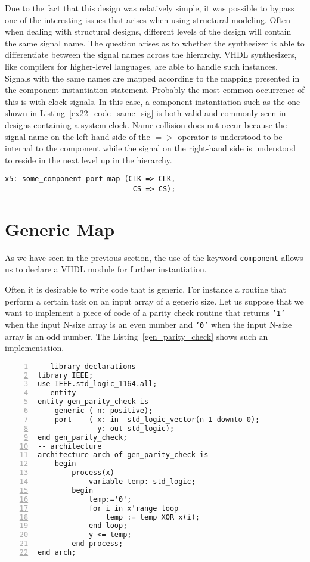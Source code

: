 Due to the fact that this design was relatively simple, it was possible to bypass one of the interesting issues that arises when using structural modeling. Often when dealing with structural designs, different levels of the design will contain the same signal name. The question arises as to whether the synthesizer is able to differentiate between the signal names across the hierarchy. VHDL synthesizers, like compilers for higher-level languages, are able to handle such instances. Signals with the same names are mapped according to the mapping presented in the component instantiation statement. Probably the most common occurrence of this is with clock signals. In this case, a component instantiation such as the one shown in Listing~\ref{ex22_code_same_sig} is both valid and commonly seen in designs containing a system clock. Name collision does not occur because the signal name on the left-hand side of the $=>$ operator is understood to be internal to the component while the signal on the right-hand side is understood to reside in the next level up in the hierarchy.

\noindent
\begin{minipage}{0.99\linewidth}
\begin{lstlisting}[label=ex22_code_same_sig, caption=Example of the same signal name crossing hierarchical boundaries.]
x5: some_component port map (CLK => CLK,
                              CS => CS);
\end{lstlisting}
\end{minipage}


\section{Generic Map}
As we have seen in the previous section, the use of the keyword \texttt{component} allows us to declare a VHDL module for further instantiation.

Often it is desirable to write code that is generic. For instance a routine that perform a certain task on an input array of a generic size. Let us suppose that we want to implement a piece of code of a parity check routine that returns \texttt{'1'} when the input N-size array is an even number and \texttt{'0'} when the input N-size array is an odd number. The Listing~\ref{gen_parity_check} shows such an implementation.

\noindent
\begin{minipage}{0.99\linewidth}
\begin{lstlisting}[numbers=left, label=gen_parity_check, caption= Parity check implementation with generic input array size.]
-- library declarations
library IEEE;
use IEEE.std_logic_1164.all;
-- entity
entity gen_parity_check is
    generic ( n: positive);
    port    ( x: in  std_logic_vector(n-1 downto 0);
              y: out std_logic);
end gen_parity_check;
-- architecture
architecture arch of gen_parity_check is
    begin
        process(x)
            variable temp: std_logic;
        begin
            temp:='0';
            for i in x'range loop
                temp := temp XOR x(i);
            end loop;
            y <= temp;
        end process;
end arch;
\end{lstlisting}
\end{minipage}


